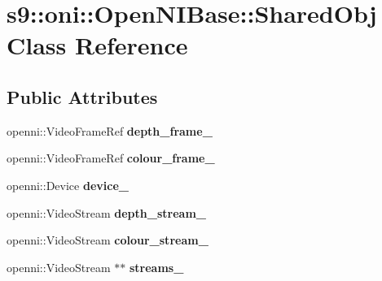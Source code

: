 \hypertarget{classs9_1_1oni_1_1OpenNIBase_1_1SharedObj}{\section{s9\-:\-:oni\-:\-:\-Open\-N\-I\-Base\-:\-:\-Shared\-Obj \-Class \-Reference}
\label{classs9_1_1oni_1_1OpenNIBase_1_1SharedObj}
}
\subsection*{\-Public \-Attributes}
\begin{DoxyCompactItemize}
\item 
\hypertarget{classs9_1_1oni_1_1OpenNIBase_1_1SharedObj_a35f97cf50ef26ea4ccda292f1e84f2c0}{openni\-::\-Video\-Frame\-Ref {\bfseries depth\-\_\-frame\-\_\-}}\label{classs9_1_1oni_1_1OpenNIBase_1_1SharedObj_a35f97cf50ef26ea4ccda292f1e84f2c0}

\item 
\hypertarget{classs9_1_1oni_1_1OpenNIBase_1_1SharedObj_af6e772ebe4ce408237a02cd5516fc1f4}{openni\-::\-Video\-Frame\-Ref {\bfseries colour\-\_\-frame\-\_\-}}\label{classs9_1_1oni_1_1OpenNIBase_1_1SharedObj_af6e772ebe4ce408237a02cd5516fc1f4}

\item 
\hypertarget{classs9_1_1oni_1_1OpenNIBase_1_1SharedObj_a8bc747e1925bbb62c43193f2be29fc29}{openni\-::\-Device {\bfseries device\-\_\-}}\label{classs9_1_1oni_1_1OpenNIBase_1_1SharedObj_a8bc747e1925bbb62c43193f2be29fc29}

\item 
\hypertarget{classs9_1_1oni_1_1OpenNIBase_1_1SharedObj_a67456be9d9b6b5b8785e2cf0ffd8c099}{openni\-::\-Video\-Stream {\bfseries depth\-\_\-stream\-\_\-}}\label{classs9_1_1oni_1_1OpenNIBase_1_1SharedObj_a67456be9d9b6b5b8785e2cf0ffd8c099}

\item 
\hypertarget{classs9_1_1oni_1_1OpenNIBase_1_1SharedObj_ada9072f589f7d008f51b963761a6fd60}{openni\-::\-Video\-Stream {\bfseries colour\-\_\-stream\-\_\-}}\label{classs9_1_1oni_1_1OpenNIBase_1_1SharedObj_ada9072f589f7d008f51b963761a6fd60}

\item 
\hypertarget{classs9_1_1oni_1_1OpenNIBase_1_1SharedObj_ab8a1ed207241b69992cd590eaaf3fe98}{openni\-::\-Video\-Stream $\ast$$\ast$ {\bfseries streams\-\_\-}}\label{classs9_1_1oni_1_1OpenNIBase_1_1SharedObj_ab8a1ed207241b69992cd590eaaf3fe98}


\end{DoxyCompactItemize}
